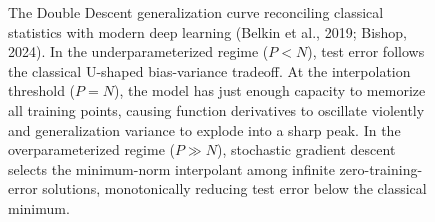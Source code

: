 \begin{figure}[H]
\caption{The Double Descent generalization curve reconciling classical statistics with modern deep learning (Belkin et al., 2019; Bishop, 2024). In the underparameterized regime ($P < N$), test error follows the classical U-shaped bias-variance tradeoff. At the interpolation threshold ($P = N$), the model has just enough capacity to memorize all training points, causing function derivatives to oscillate violently and generalization variance to explode into a sharp peak. In the overparameterized regime ($P \gg N$), stochastic gradient descent selects the minimum-norm interpolant among infinite zero-training-error solutions, monotonically reducing test error below the classical minimum.}
\label{fig:double_descent_curve}
\end{figure}

